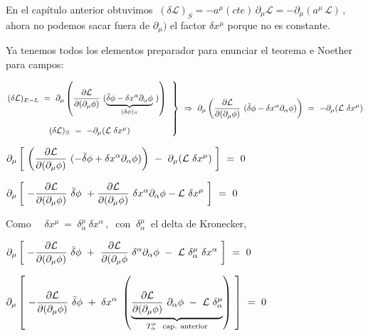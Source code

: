 \textcolor{gris}{En el capítulo anterior obtuvimos $\ (\delta \mathcal L)_S=-a^\mu(cte)\, \partial_\mu \mathcal L =-\partial_\mu (a^\mu \, \mathcal L)\, , \ $ ahora no podemos sacar fuera de $\partial_\mu)$ el factor $\delta x^\mu$ porque no es constante.}

\vspace{5mm}

Ya tenemos todos los elementos preparador para enunciar el teorema e Noether para campos:

$\left.
\begin{matrix} 
(\delta \mathcal L)_{E-L} \ = \ \partial_\mu \displaystyle \left( \pdv{\mathcal L}{(\partial_\mu \phi)} \ ( \underbrace{\bar \delta \phi - \delta x^\alpha \partial_\alpha \phi}_{(\delta \phi)_S}\ ) \right) \ \ \\ \\ (\delta \mathcal L)_S \ = \ -\partial_\mu (\mathcal L \ \delta x^\mu ) \end{matrix} \right\}\ \Rightarrow \ \partial_\mu  \displaystyle \left( \pdv{\mathcal L}{ (\partial_\mu \phi) } \ ( \bar \delta \phi - \delta x^\alpha \partial_\alpha \phi) \right) \ = \ -\partial_\mu (\mathcal L \ \delta x^\mu)$

$\displaystyle 
\partial_\mu  \displaystyle 
\left[\ 
\left( \pdv{\mathcal L}{ (\partial_\mu \phi) } \ ( -\bar \delta \phi + \delta x^\alpha \partial_\alpha \phi) \right) \ - \ \partial_\mu (\mathcal L \ \delta x^\mu)  \ \right] 
\ = \ 0$

$\displaystyle 
\partial_\mu  \displaystyle 
\left[\ 
- \pdv{\mathcal L}{ (\partial_\mu \phi) } \ \bar \delta \phi \ 
+ \pdv{\mathcal L}{ (\partial_\mu \phi) } \ \delta x^\alpha \partial_\alpha \phi
- \mathcal L \ \delta x^\mu  \ \right] 
\ = \ 0$

Como $\quad \delta x^\mu\ =\ \delta_\alpha^\mu \ \delta x^\alpha\, , 	 \ \text{ con } \ \delta_\alpha^\mu \ $ el delta de Kronecker,

$\displaystyle \partial_\mu 
\left[ \ 
-\pdv{\mathcal L}{(\partial_\mu \phi)} \ \bar \delta \phi \ 
+ \ \pdv{\mathcal L}{(\partial_\mu \phi}\ \delta^\alpha \partial_\alpha \phi \ - \ 
\mathcal L \ \delta_\alpha^\mu \ \delta x^\alpha 
\ \right] \ = \ 0$

$\displaystyle \partial_\mu 
\left[ \ 
-\pdv{\mathcal L}{(\partial_\mu \phi)} \ \bar \delta \phi \ + \ 
\delta x^\alpha \ \left(
\underbrace{
\pdv{\mathcal L}{(\partial_\mu \phi)} \ \partial_\alpha \phi \ - \ \mathcal L \ \delta_\alpha^\mu }_{ T^\mu_\alpha \ \text{ cap. anterior}}
\right)
 \ \right]  \ = \ 0$
 

